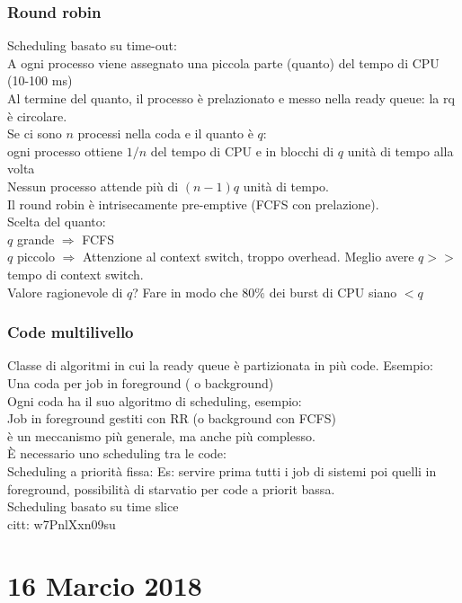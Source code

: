 \documentclass{article}
\begin{document}
\subsubsection*{Round robin}
Scheduling basato su time-out:\\
A ogni processo viene assegnato una piccola parte (quanto) del tempo di CPU (10-100 ms)\\
Al termine del quanto, il processo \`{e} prelazionato e messo nella ready queue: la rq \`{e} circolare.\\
Se ci sono $n$ processi nella coda e il quanto \`{e} $q$:\\
ogni processo ottiene $1/n$ del tempo di CPU e in blocchi di $q$ unit\`{a} di tempo alla volta\\
Nessun processo attende pi\`{u} di $(n-1)q$ unit\`{a} di tempo.\\
Il round robin \`{e} intrisecamente pre-emptive (FCFS con prelazione).\\
Scelta del quanto:\\
$q$ grande $\Rightarrow$ FCFS\\
$q$ piccolo $\Rightarrow$ Attenzione al context switch, troppo overhead. Meglio avere
$q>> $tempo di context switch.\\
Valore ragionevole di $q$? Fare in modo che $80\%$ dei burst di CPU siano $<q$\\
\subsubsection*{Code multilivello}
Classe di algoritmi in cui la ready queue \`{e} partizionata in pi\`{u} code. Esempio:\\
Una coda per job in foreground ( o background)\\
Ogni coda ha il suo algoritmo di scheduling, esempio:\\
Job in foreground gestiti con RR (o background con FCFS)\\
\`{e} un meccanismo pi\`{u} generale, ma anche pi\`{u} complesso.\\
\`{E} necessario uno scheduling tra le code:\\
Scheduling a priorit\`{a} fissa: Es: servire prima tutti i job di sistemi poi quelli in foreground, possibilit\`{a} di starvatio per code a priorit
bassa.\\
Scheduling basato su time slice\\
citt: w7PnlXxn09su
\section*{16 Marcio 2018}
\end{document}
